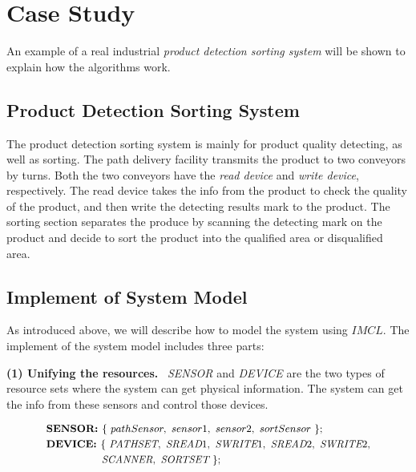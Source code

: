 \section{Case Study}
An example of a real industrial \emph{product detection sorting system} will be shown to explain how the algorithms work.

\subsection{Product Detection Sorting System}
The product detection sorting system is mainly for product quality detecting, as well as sorting. The path delivery facility transmits the product to two conveyors by turns. Both the two conveyors have the \emph{read device} and \emph{write device}, respectively. The read device takes the info from the product to check the quality of the product, and then write the detecting results mark to the product. The sorting section separates the produce by scanning the detecting mark on the product and decide to sort the product into the qualified area or disqualified area.


\subsection{Implement of System Model}
As introduced above, we will describe how to model the system using $IMCL$. The implement of the system model includes three parts:

\textbf{(1) Unifying the resources.} \ \emph{SENSOR} and \emph{DEVICE} are the two types of resource sets where the system can get physical information. The system can get the info from these sensors and control those devices.

\begin{equation*}
\footnotesize
    \begin{aligned}
       & \textbf{SENSOR: }  \{ \ pathSensor, \ sensor1, \ sensor2, \ sortSensor \ \}; \\
       & \textbf{DEVICE: }  \{ \ \emph{PATHSET}, \ \emph{SREAD}1, \ \emph{SWRITE}1, \ \emph{SREAD}2, \ \emph{SWRITE}2, \\
       & \ \ \ \ \ \ \ \ \ \ \ \ \ \ \ \ \emph{SCANNER}, \ \emph{SORTSET} \ \};
    \end{aligned}
\end{equation*}

